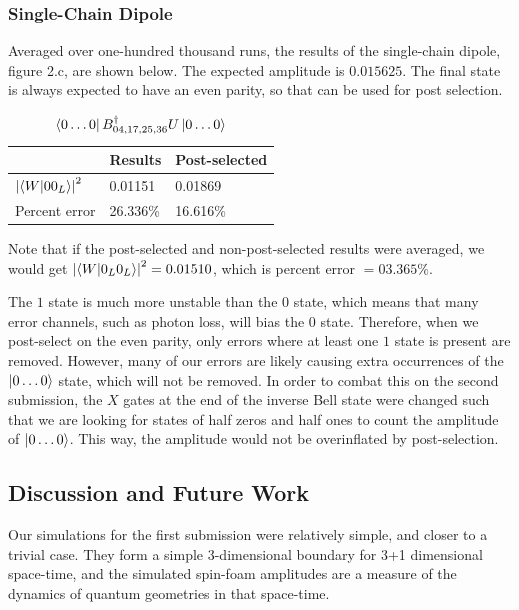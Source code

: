 \documentclass[a4paper,11pt,aps,tightenlines,nofootinbib]{revtex4}
\begin{document}
        \subsubsection{Single-Chain Dipole}
        Averaged over one-hundred thousand runs, the results of the single-chain dipole, figure 2.c, are shown below. 
        The expected amplitude is $0.015625$. The final state is always expected to have an even parity, so that can be used for post selection.
        \begin{table}[h]
        \begin{centering}
                \begin{tabular}{|l|l|l|}
                        \hline
                        & Results & Post-selected\\ \hline
                        $\abs{\bra{W}\ket{00_L}}^2$ & 0.01151 & 0.01869\\ \hline
                        Percent error &  26.336\%& 16.616\% \\\hline
                \end{tabular}
                \caption{$\bra{0\dots0}B^\dagger_{04,17,25,36}U\ket{0\dots 0}$}
        \end{centering}
        \end{table}

        Note that if the post-selected and non-post-selected results were averaged, we 
        would get $\abs{\bra{W}\ket{0_L0_L}}^2=0.01510$, which is percent error $=03.365\%$. 

        The $1$ state is much more unstable than the $0$ state, which means that many error channels,
         such as photon loss, will bias the $0$ state\cite{photon-loss}. Therefore, when we post-select 
        on the even parity, only errors where at least one  $1$ state is present are removed. However, many 
        of our errors are likely causing extra occurrences of the $\ket{0\dots0}$ state, which will not be removed.
        In order to combat this on the second submission, the $X$ gates at the end of the inverse Bell state were 
        changed such that we are looking for states of half zeros and half ones to count the amplitude of 
        $\ket{0\dots0}$. This way, the amplitude would not be overinflated by post-selection.

\subsection{Discussion and Future Work}
        Our simulations for the first submission were relatively simple, and closer to a trivial case. They  
        form a simple 3-dimensional boundary for 3+1 dimensional space-time, and the simulated spin-foam amplitudes are 
        a measure of the dynamics of quantum geometries in that space-time.
\end{document}
